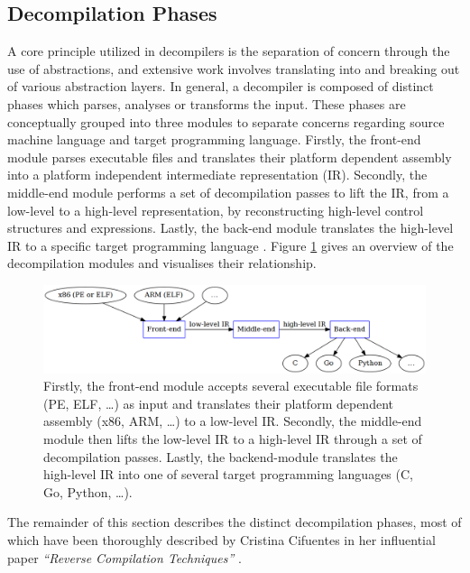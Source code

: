 
\subsection{Decompilation Phases}
\label{sec:lit_review_decompilation_phases}

A core principle utilized in decompilers is the separation of concern through the use of abstractions, and extensive work involves translating into and breaking out of various abstraction layers. In general, a decompiler is composed of distinct phases which parses, analyses or transforms the input. These phases are conceptually grouped into three modules to separate concerns regarding source machine language and target programming language. Firstly, the front-end module parses executable files and translates their platform dependent assembly into a platform independent intermediate representation (IR). Secondly, the middle-end module performs a set of decompilation passes to lift the IR, from a low-level to a high-level representation, by reconstructing high-level control structures and expressions. Lastly, the back-end module translates the high-level IR to a specific target programming language \cite{reverse_comp}. Figure \ref{fig:modules_overview} gives an overview of the decompilation modules and visualises their relationship.

\begin{figure}[htbp]
	\begin{center}
		\includegraphics[width=\textwidth]{inc/2_lit_review/modules_overview.png}
		\caption{Firstly, the front-end module accepts several executable file formats (PE, ELF, …) as input and translates their platform dependent assembly (x86, ARM, …) to a low-level IR. Secondly, the middle-end module then lifts the low-level IR to a high-level IR through a set of decompilation passes. Lastly, the backend-module translates the high-level IR into one of several target programming languages (C, Go, Python, …).}
		\label{fig:modules_overview}
	\end{center}
\end{figure}

The remainder of this section describes the distinct decompilation phases, most of which have been thoroughly described by Cristina Cifuentes in her influential paper \textit{``Reverse Compilation Techniques''} \cite{reverse_comp}.





